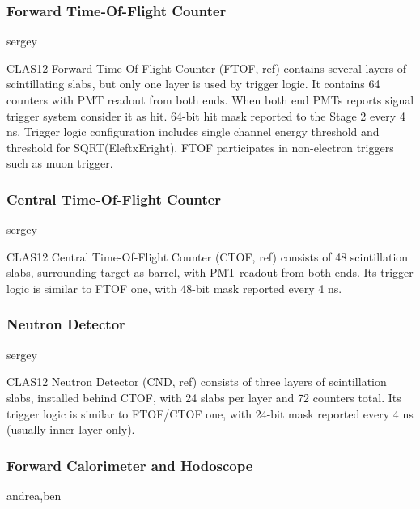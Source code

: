 \subsubsection{Forward Time-Of-Flight Counter} sergey

CLAS12 Forward Time-Of-Flight Counter (FTOF, ref) contains several layers of scintillating slabs, but only one layer is used by trigger logic. It contains 64 counters with PMT readout from both ends. When both end PMTs reports signal trigger system consider it as hit. 64-bit hit mask reported to the Stage 2 every 4 ns. Trigger logic configuration includes single channel energy threshold and threshold for SQRT(EleftxEright). FTOF participates in non-electron triggers such as muon trigger.


\subsubsection{Central Time-Of-Flight Counter} sergey

CLAS12 Central Time-Of-Flight Counter (CTOF, ref) consists of 48 scintillation slabs, surrounding target as barrel, with PMT readout from both ends. Its trigger logic is similar to FTOF one, with 48-bit mask reported every 4 ns.


\subsubsection{Neutron Detector} sergey

CLAS12 Neutron Detector (CND, ref) consists of three layers of scintillation slabs, installed behind CTOF, with 24 slabs per layer and 72 counters total. Its trigger logic is similar to FTOF/CTOF one, with 24-bit mask reported every 4 ns (usually inner layer only).


\subsubsection{Forward Calorimeter and Hodoscope} andrea,ben

